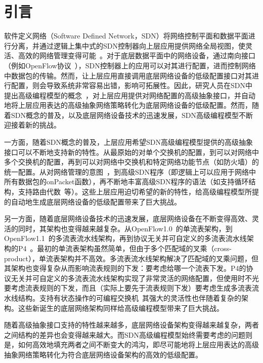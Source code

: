 \documentclass{ctexart}
\begin{document}
 

\section{引言}

软件定义网络（Software Defined Network，SDN）将网络控制平面和数据平面进行分离，并通过逻辑上集中式的SDN控制器向上层应用提供网络全局视图，使灵活、高效的网络管理变得可能~\cite{mckeown2008openflow,feamster2013road,b4}。对于底层数据平面中的网络设备，通过南向接口（例如OpenFlow协议~\cite{mckeown2008openflow}），SDN控制器上的应用可以对其进行配置，进而控制网络中数据包的传输。然而，让上层应用直接调用底层网络设备的低级配置接口对其进行配置，则会导致系统非常容易出错，影响可拓展性。因此，研究人员在SDN中提出高级编程模型的概念~\cite{foster2011frenetic,maple,reich2013modular}，对上层应用提供对网络配置的高级抽象接口，并自动地将上层应用表达的高级抽象网络策略转化为底层网络设备的低级配置。然而，随着SDN概念的普及，以及底层网络设备技术的迅速发展，SDN高级编程模型不断迎接着新的挑战。

一方面，随着SDN概念的普及，上层应用希望SDN高级编程模型提供的高级抽象接口可以不断地支持新的特性。从最原始的对单个交换机的配置，到可以对网络中多个交换机的配置，再到可以对网络中交换机和特定网络功能节点（如防火墙）的统一配置。从对网络管理的意图~\cite{berde2014onos}，到高级SDN程序（即逻辑上可以应用于网络中所有数据包的onPacket函数），再不断地丰富高级SDN程序的语法（如支持循环结构，支持路由代数~\cite{gao2018t}等）。这些上层应用迫切希望的新的特性，给高级编程模型所提的自动地生成底层网络设备的低级配置带来了巨大挑战。

另一方面，随着底层网络设备技术的迅速发展，底层网络设备在不断变得高效、灵活的同时，其架构也变得越来越复杂。从OpenFlow1.0~\cite{openflow1}的单流表架构，到OpenFlow1.1~\cite{openflow1-1}的多流表流水线架构，再到协议无关并可自定义的多流表流水线架构的P4~\cite{P4}。最初的单流表架构虽然简单，但由于多个匹配域的叉乘（cross-product），单流表架构并不高效。多流表流水线架构解决了匹配域的叉乘问题，但其架构也变得复杂从而影响流表规则的下发：要考虑给哪一个流表下发。P4的协议无关并可自定义的多流表流水线架构实现了非常灵活的网络配置，但使用时不光要考虑流表规则的下发，而且（实际上要先于流表规则下发）要考虑生成多流表流水线结构。支持有状态操作的可编程交换机~\cite{moshref2014flow,bianchi2014openstate}其强大的灵活性也伴随着复杂的架构。这些新诞生的底层网络架构同样给高级编程模型带来了巨大挑战。

随着高级抽象接口支持的特性越来越多，底层网络设备架构变得越来越复杂，两者之间结构的差异也会变得越来越大。而SDN高级编程模型始终需要考虑的问题则是，如何高效地填充两者之间不断变大的鸿沟，即尽可能地将上层应用表达的高级抽象网络策略转化为符合底层网络设备架构的高效的低级配置。
\end{document}
